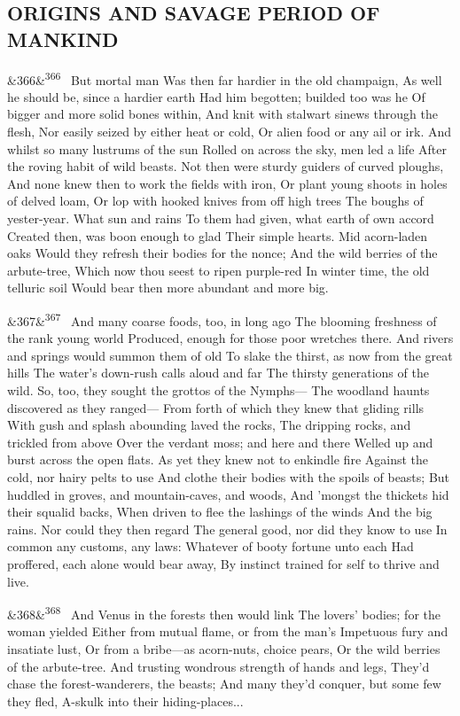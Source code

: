\documentclass[12pt]{article}
\newcommand{\para}[1][]{\par\noindent\ifx&#1&\else\textsuperscript{\footnotesize #1}~\fi}
\begin{document}
\subsection*{ORIGINS AND SAVAGE PERIOD OF MANKIND}

\para[366] But mortal man Was then far hardier in the old champaign, As well he should be, since a hardier earth Had him begotten; builded too was he Of bigger and more solid bones within, And knit with stalwart sinews through the flesh, Nor easily seized by either heat or cold, Or alien food or any ail or irk. And whilst so many lustrums of the sun Rolled on across the sky, men led a life After the roving habit of wild beasts. Not then were sturdy guiders of curved ploughs, And none knew then to work the fields with iron, Or plant young shoots in holes of delved loam, Or lop with hooked knives from off high trees The boughs of yester-year. What sun and rains To them had given, what earth of own accord Created then, was boon enough to glad Their simple hearts. Mid acorn-laden oaks Would they refresh their bodies for the nonce; And the wild berries of the arbute-tree, Which now thou seest to ripen purple-red In winter time, the old telluric soil Would bear then more abundant and more big.

\para[367] And many coarse foods, too, in long ago The blooming freshness of the rank young world Produced, enough for those poor wretches there. And rivers and springs would summon them of old To slake the thirst, as now from the great hills The water's down-rush calls aloud and far The thirsty generations of the wild. So, too, they sought the grottos of the Nymphs--- The woodland haunts discovered as they ranged--- From forth of which they knew that gliding rills With gush and splash abounding laved the rocks, The dripping rocks, and trickled from above Over the verdant moss; and here and there Welled up and burst across the open flats. As yet they knew not to enkindle fire Against the cold, nor hairy pelts to use And clothe their bodies with the spoils of beasts; But huddled in groves, and mountain-caves, and woods, And 'mongst the thickets hid their squalid backs, When driven to flee the lashings of the winds And the big rains. Nor could they then regard The general good, nor did they know to use In common any customs, any laws: Whatever of booty fortune unto each Had proffered, each alone would bear away, By instinct trained for self to thrive and live.

\para[368] And Venus in the forests then would link The lovers' bodies; for the woman yielded Either from mutual flame, or from the man's Impetuous fury and insatiate lust, Or from a bribe---as acorn-nuts, choice pears, Or the wild berries of the arbute-tree. And trusting wondrous strength of hands and legs, They'd chase the forest-wanderers, the beasts; And many they'd conquer, but some few they fled, A-skulk into their hiding-places...
\end{document}
